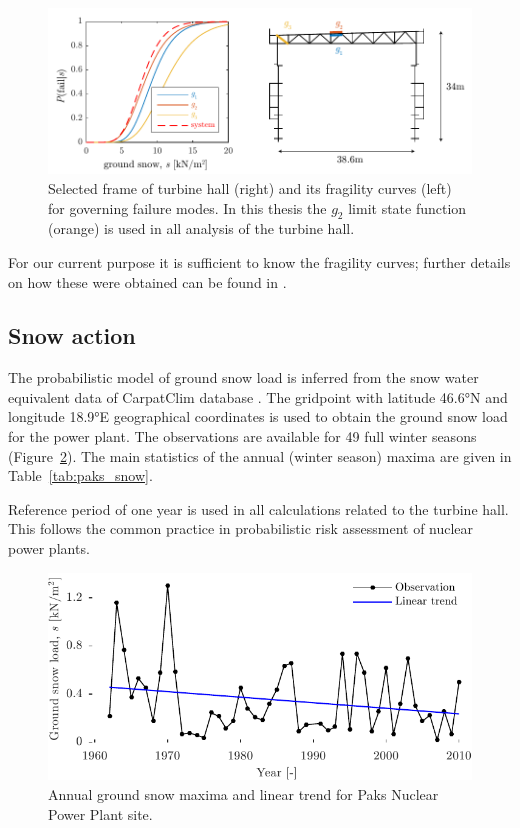 \begin{figure}[htbp!] 
	\centering    
	\includegraphics[]{frame_28(26)_fragility.pdf}
	\caption{Selected frame of turbine hall (right) and its fragility curves (left) for governing failure modes. In this thesis the $g_2$ limit state function (orange) is used in all analysis of the turbine hall.}
	\label{fig:frame_fragi}
\end{figure}

For our current purpose it is sufficient to know the fragility curves; further details on how these were obtained can be found in \citet{PaksMethod2014, PaksAppl2014}.

\subsection{Snow action}
The probabilistic model of ground snow load is inferred from the snow water equivalent data of CarpatClim database \citep{Szalai2013}. The gridpoint with latitude 46.6°N and longitude 18.9°E geographical coordinates is used to obtain the ground snow load for the power plant. The observations are available for 49 full winter seasons (Figure~\ref{fig:amax_year_paks}). The main statistics of the annual (winter season) maxima are given in Table~\ref{tab:paks_snow}.

Reference period of one year is used in all calculations related to the turbine hall. This follows the common practice in probabilistic risk assessment of nuclear power plants.

\begin{figure}[htbp!] 
	\centering    
	\includegraphics[]{amax_year_paks.pdf}
	\caption{Annual ground snow maxima and linear trend for Paks Nuclear Power Plant site.}
	\label{fig:amax_year_paks}
\end{figure}


